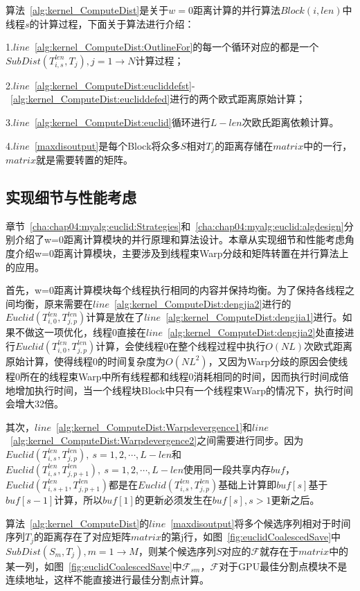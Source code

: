 算法~\ref{alg:kernel_ComputeDist}是关于$w=0$距离计算的并行算法$Block(i,len)$中线程$s$的计算过程，下面关于算法进行介绍：

1.$line$~\ref{alg:kernel_ComputeDist:OutlineFor}的每一个循环对应的都是一个$SubDist(T_{i,s}^{len},T_j),j=1\to N$计算过程；

2.$line$~\ref{alg:kernel_ComputeDist:eucliddefst}-~\ref{alg:kernel_ComputeDist:eucliddefed}进行的两个欧式距离原始计算；

3.$line$~\ref{alg:kernel_ComputeDist:euclid}循环进行$L-len$次欧氏距离依赖计算。

4.$line$~\ref{maxdisoutput}是每个Block将众多$S$相对$T_j$的距离存储在$matrix$中的一行，$matrix$就是需要转置的矩阵。

\subsection{实现细节与性能考虑}
\label{cha:chap04:myalg:euclid:trick}

章节~\ref{cha:chap04:myalg:euclid:Strategies}和~\ref{cha:chap04:myalg:euclid:algdesign}分别介绍了w=0距离计算模块的并行原理和算法设计。本章从实现细节和性能考虑角度介绍w=0距离计算模块，主要涉及到线程束Warp分歧和矩阵转置在并行算法上的应用。

首先，w=0距离计算模块每个线程执行相同的内容并保持均衡。为了保持各线程之间均衡，原来需要在$line$~\ref{alg:kernel_ComputeDist:dengjia2}进行的$Euclid(T_{i,0}^{len},T_{j,p}^{len})$计算是放在了$line$~\ref{alg:kernel_ComputeDist:dengjia1}进行。如果不做这一项优化，线程0直接在$line$~\ref{alg:kernel_ComputeDist:dengjia2}处直接进行$Euclid(T_{i,0}^{len},T_{j,p}^{len})$计算，会使线程0在整个线程过程中执行$O(NL)$次欧式距离原始计算，使得线程0的时间复杂度为$O(NL^2)$，又因为Warp分歧的原因会使线程0所在的线程束Warp中所有线程都和线程0消耗相同的时间，因而执行时间成倍地增加执行时间，当一个线程块Block中只有一个线程束Warp的情况下，执行时间会增大32倍。

其次，$line$~\ref{alg:kernel_ComputeDist:Warpdevergence1}和$line$~\ref{alg:kernel_ComputeDist:Warpdevergence2}之间需要进行同步。因为$Euclid(T_{i,s}^{len},T_{j,p}^{len}),~s=1,2,\cdots,L-len$和$Euclid(T_{i,s}^{len},T_{j,p+1}^{len}),~s=1,2,\cdots,L-len$使用同一段共享内存$buf$，$Euclid(T_{i,s+1}^{len},T_{j,p+1}^{len})$都是在$Euclid(T_{i,s}^{len},T_{j,p}^{len})$基础上计算即$buf[s]$基于$buf[s-1]$计算，所以$buf[1]$的更新必须发生在$buf[s],s>1$更新之后。

算法~\ref{alg:kernel_ComputeDist}的$line$~\ref{maxdisoutput}将多个候选序列相对于时间序列$T_j$的距离存在了对应矩阵$matrix$的第j行，如图~\ref{fig:euclidCoalescedSave}中$SubDist(S_m,T_j),m=1\to M$，则某个候选序列$S$对应的$\mathcal{F}$就存在于$matrix$中的某一列，如图~\ref{fig:euclidCoalescedSave}中$\mathcal{F}_{sm}$，$\mathcal{F}$对于GPU最佳分割点模块不是连续地址，这样不能直接进行最佳分割点计算。

